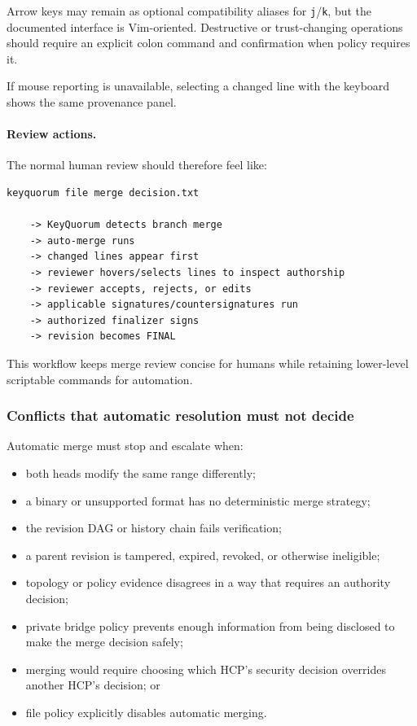 \documentclass[11pt]{article}
\begin{document}
Arrow keys may remain as optional compatibility aliases for \texttt{j}/\texttt{k}, but the documented interface is Vim-oriented. Destructive or trust-changing operations should require an explicit colon command and confirmation when policy requires it.


If mouse reporting is unavailable, selecting a changed line with the keyboard shows the same provenance panel.

\paragraph{Review actions.}

The normal human review should therefore feel like:

\begin{lstlisting}
keyquorum file merge decision.txt

    -> KeyQuorum detects branch merge
    -> auto-merge runs
    -> changed lines appear first
    -> reviewer hovers/selects lines to inspect authorship
    -> reviewer accepts, rejects, or edits
    -> applicable signatures/countersignatures run
    -> authorized finalizer signs
    -> revision becomes FINAL
\end{lstlisting}

This workflow keeps merge review concise for humans while retaining lower-level scriptable commands for automation.


\subsubsection*{Conflicts that automatic resolution must not decide}

Automatic merge must stop and escalate when:

\begin{itemize}[leftmargin=1.5em]
  \item both heads modify the same range differently;
  \item a binary or unsupported format has no deterministic merge strategy;
  \item the revision DAG or history chain fails verification;
  \item a parent revision is tampered, expired, revoked, or otherwise ineligible;
  \item topology or policy evidence disagrees in a way that requires an authority decision;
  \item private bridge policy prevents enough information from being disclosed to make the merge decision safely;
  \item merging would require choosing which HCP's security decision overrides another HCP's decision; or
  \item file policy explicitly disables automatic merging.
\end{itemize}
\end{document}
